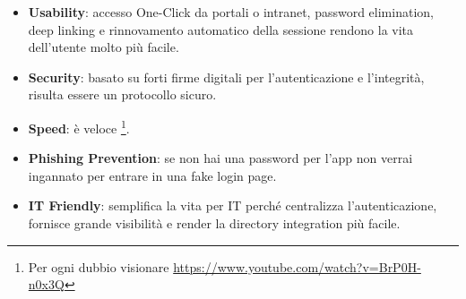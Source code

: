 \begin{itemize}
      \item \textbf{Usability}: accesso One-Click da portali o intranet, password
            elimination, deep linking e rinnovamento automatico della sessione
            rendono la vita dell'utente molto più facile.
      \item \textbf{Security}: basato su forti firme digitali per l'autenticazione
            e l'integrità, \saml{} risulta essere un protocollo sicuro.
      \item \textbf{Speed}: \saml{} è veloce \footnote{Per ogni dubbio visionare \url{https://www.youtube.com/watch?v=BrP0H-n0x3Q}}.
      \item \textbf{Phishing Prevention}: se non hai una password per l'app non
            verrai ingannato per entrare in una fake login page.
      \item \textbf{IT Friendly}: \saml{} semplifica la vita per IT perché centralizza
            l'autenticazione, fornisce grande visibilità e render la
            directory integration
            più facile.
\end{itemize}